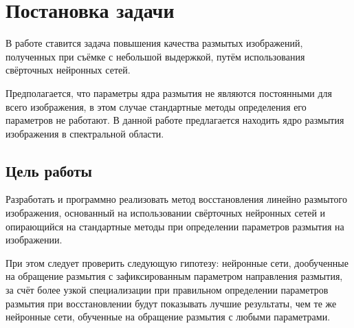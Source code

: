 \newpage
\section{Постановка задачи}
В работе ставится задача повышения качества размытых изображений, полученных при съёмке с небольшой выдержкой, путём использования свёрточных нейронных сетей.

Предполагается, что параметры ядра размытия не являются постоянными для всего изображения, в этом случае стандартные методы определения его параметров не работают. В данной работе предлагается находить ядро размытия изображения в спектральной области. 
\par

\subsection{Цель работы}
Разработать и программно реализовать метод восстановления линейно размытого изображения, основанный на использовании свёрточных нейронных сетей и опирающийся на стандартные методы при определении параметров размытия на изображении.
\par
При этом следует проверить следующую гипотезу: нейронные сети, дообученные на обращение размытия с зафиксированным параметром направления размытия, за счёт более узкой специализации при правильном определении параметров размытия при восстановлении будут показывать лучшие результаты, чем те же нейронные сети, обученные на обращение размытия с любыми параметрами.

